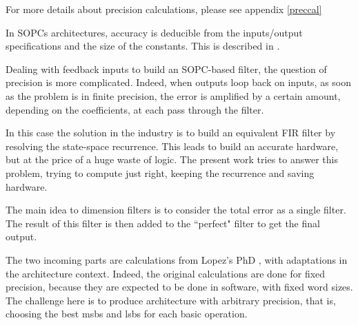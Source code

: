 \begingroup

	\fontsize{7}{9}\selectfont
	For more details about precision calculations, please see appendix \ref{preccal}

\endgroup
	In SOPCs architectures, accuracy is deducible from the inputs/output specifications and the size of the constants.
	This is described in \cite{sums}.

	Dealing with feedback inputs to build an SOPC-based filter, the question of precision is more complicated.
	Indeed, when outputs loop back on inputs, as soon as the problem is in finite precision, the error is amplified by a certain amount, depending on the coefficients, at each pass through the filter.

	In this case the solution in the industry is to build an equivalent FIR filter by resolving the state-space recurrence.
	This leads to build an accurate hardware, but at the price of a huge waste of logic.
	The present work tries to answer this problem, trying to compute just right, keeping the recurrence and saving hardware.

	The main idea to dimension filters is to consider the total error as a single filter.
	The result of this filter is then added to the ``perfect" filter to get the final output.

	The two incoming parts are calculations from Lopez's PhD \cite{lopez}, with adaptations in the architecture context.
	Indeed, the original calculations are done for fixed precision, because they are expected to be done in software, with fixed word sizes.
	The challenge here is to produce architecture with arbitrary precision, that is, choosing the best msbs and lsbs for each basic operation.



